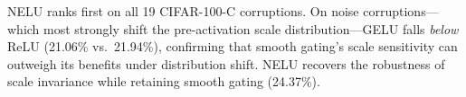 NELU ranks first on all 19 CIFAR-100-C corruptions.
On noise corruptions---which most strongly shift the pre-activation scale distribution---GELU falls \emph{below} ReLU (21.06\% vs.\ 21.94\%), confirming that smooth gating's scale sensitivity can outweigh its benefits under distribution shift.
NELU recovers the robustness of scale invariance while retaining smooth gating (24.37\%).